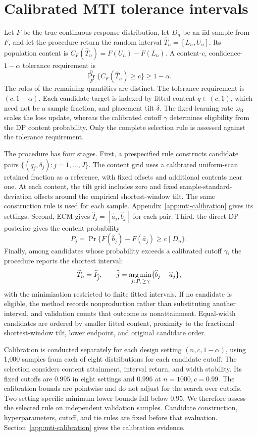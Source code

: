 \section{Calibrated MTI tolerance intervals}
\label{rqr2026:sec:mti-tolerance}

Let \(F\) be the true continuous response distribution, let \(D_n\) be an iid
sample from \(F\), and let the procedure return the random interval
\(\widehat T_n=[L_n,U_n]\). Its population content is
\(C_F(\widehat T_n)=F(U_n)-F(L_n)\). A content-\(c\), confidence-\(1-\alpha\)
tolerance requirement is
\[
\Pr_F^n\{C_F(\widehat T_n)\ge c\}\ge 1-\alpha.
\]
The roles of the remaining quantities are distinct. The tolerance requirement
is \((c,1-\alpha)\). Each candidate target is indexed by fitted content
\(q\in(c,1)\), which need not be a sample fraction, and placement tilt
\(\delta\). The fixed learning rate \(\omega_{\mathrm R}\) scales the loss
update, whereas the calibrated cutoff \(\gamma\) determines eligibility from
the DP content probability. Only the complete selection rule is assessed
against the tolerance requirement.

The procedure has four stages. First, a prespecified rule constructs candidate
pairs \(\{(q_j,\delta_j):j=1,\ldots,J\}\). The content grid uses a calibrated
uniform-scan retained fraction as a reference, with fixed offsets and
additional contents near one. At each content, the tilt grid includes zero
and fixed sample-standard-deviation offsets around the empirical
shortest-window tilt. The same construction rule is used for each sample.
Appendix~\ref{app:mti-calibration} gives its settings. Second, ECM gives
\(\widehat I_j=[\widehat a_j,\widehat b_j]\) for each pair. Third, the direct DP
posterior gives the content probability
\[
P_j=\Pr\{F(\widehat b_j)-F(\widehat a_j)\ge c\mid D_n\}.
\]
Finally, among candidates whose probability exceeds a calibrated cutoff
\(\gamma\), the procedure reports the shortest interval:
\[
\widehat T_n=\widehat I_{\widehat j},\qquad
\widehat j=\operatorname*{arg\,min}_{j:\,P_j\ge\gamma}
\{\widehat b_j-\widehat a_j\},
\]
with the minimization restricted to finite fitted intervals. If no candidate is
eligible, the method records nonproduction rather than substituting another
interval, and validation counts that outcome as nonattainment. Equal-width
candidates are ordered by smaller fitted content, proximity to the fractional
shortest-window tilt, lower endpoint, and original candidate order.

Calibration is conducted separately for each design setting
\((n,c,1-\alpha)\), using 1,000 samples from each of eight distributions for
each candidate cutoff. The selection considers content attainment, interval
return, and width stability. Its fixed cutoffs are \(0.995\) in eight
settings and \(0.996\) at \(n=1000,c=0.99\). The calibration bounds are
pointwise and do not adjust for the search over cutoffs. Two setting-specific
minimum lower bounds fall below \(0.95\). We therefore assess the selected
rule on independent validation samples. Candidate construction,
hyperparameters, cutoff, and tie rules are fixed before that evaluation.
Section~\ref{app:mti-calibration} gives the calibration evidence.

